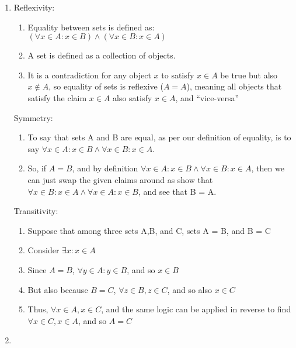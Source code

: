 \documentclass{article}
\begin{document}
    \begin{enumerate}
        \item Reflexivity:
            \begin{enumerate}
                \item Equality between sets is defined as: $(\forall x \in A: x
                    \in B) \land (\forall x \in B: x \in A)$
                \item A set is defined as a collection of objects.
                \item It is a contradiction for any object $x$ to satisfy $x
                    \in A$ be true but also $x \notin A$, so equality of sets
                    is reflexive ($A = A$), meaning all objects that satisfy
                    the claim $x \in A$ also satisfy $x \in A$, and
                    ``vice-versa''
            \end{enumerate}
            Symmetry:
            \begin{enumerate}
                \item To say that sets A and B are equal, as per our definition
                    of equality, is to say $\forall x \in A: x \in B \land
                    \forall x \in B: x \in A$.
                \item So, if $A = B$, and by definition $\forall x \in A: x \in
                    B \land \forall x \in B: x \in A$, then we can just swap
                    the given claims around as show that $\forall x \in B: x
                    \in A \land \forall x \in A: x \in B$, and see that B = A.
            \end{enumerate}
            Transitivity:
            \begin{enumerate}
                \item Suppose that among three sets A,B, and C, sets A = B, and
                    B = C
                \item Consider $\exists x : x \in A$
                \item Since $A = B$, $\forall y \in A : y \in B$, and so $x \in B$
                \item But also because $B = C$, $\forall z \in B, z \in C$, and so also $x \in C$
                \item Thus, $\forall x \in A, x \in C$, and the same logic can
                    be applied in reverse to find $\forall x \in C, x \in A$, and so $A = C$
            \end{enumerate}
        \item

\end{enumerate}
\end{document}
